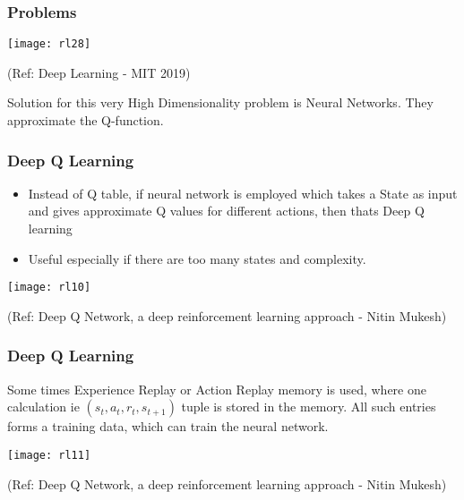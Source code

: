\begin{frame}[fragile]\frametitle{Problems}
\begin{center}
\texttt{[image: rl28]}
\end{center}

{\tiny (Ref: Deep Learning - MIT 2019)}

Solution for this very High Dimensionality problem is Neural Networks. They approximate the Q-function.

\end{frame}


\begin{frame}[fragile]\frametitle{Deep Q Learning}

\begin{itemize}
\item Instead of Q table, if neural network is employed which takes a State as input and gives approximate Q values for different actions, then thats Deep Q learning
\item Useful especially if there are too many states and complexity.
\end{itemize}

\begin{center}
\texttt{[image: rl10]}
\end{center}

{\tiny (Ref: Deep Q Network, a deep reinforcement learning approach - Nitin Mukesh)}
\end{frame}


\begin{frame}[fragile]\frametitle{Deep Q Learning}

Some times Experience Replay or Action Replay memory is used, where one calculation ie $(s_t,a_t,r_t,s_{t+1})$ tuple is stored in the memory. All such entries forms a training data, which can train the neural network.

\begin{center}
\texttt{[image: rl11]}
\end{center}

{\tiny (Ref: Deep Q Network, a deep reinforcement learning approach - Nitin Mukesh)}
\end{frame}

